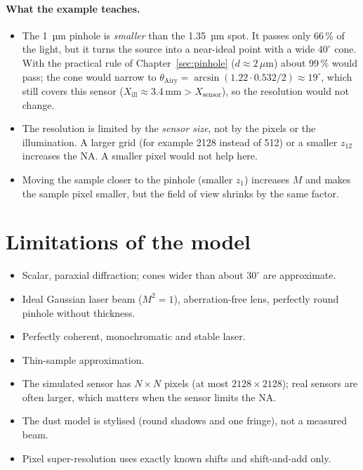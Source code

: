 \documentclass[12pt,a4paper]{article}
\newcommand{\um}{\,\mu\mathrm{m}}
\newcommand{\mm}{\,\mathrm{mm}}
\begin{document}
\paragraph{What the example teaches.}
\begin{itemize}
\item The 1~µm pinhole is \emph{smaller} than the 1.35~µm spot. It passes only 66\,\% of the light, but it turns the source into a near-ideal point with a wide $40^\circ$ cone. With the practical rule of Chapter~\ref{sec:pinhole} ($d\approx2\um$) about 99\,\% would pass; the cone would narrow to $\theta_\mathrm{Airy}=\arcsin(1.22\cdot0.532/2)\approx19^\circ$, which still covers this sensor ($X_\mathrm{ill}\approx3.4\mm>X_\mathrm{sensor}$), so the resolution would not change.
\item The resolution is limited by the \emph{sensor size}, not by the pixels or the illumination. A larger grid (for example 2128 instead of 512) or a smaller $z_{12}$ increases the NA. A smaller pixel would not help here.
\item Moving the sample closer to the pinhole (smaller $z_1$) increases $M$ and makes the sample pixel smaller, but the field of view shrinks by the same factor.
\end{itemize}

\section{Limitations of the model}
\begin{itemize}
\item Scalar, paraxial diffraction; cones wider than about $30^\circ$ are approximate.
\item Ideal Gaussian laser beam ($M^2=1$), aberration-free lens, perfectly round pinhole without thickness.
\item Perfectly coherent, monochromatic and stable laser.
\item Thin-sample approximation.
\item The simulated sensor has $N\times N$ pixels (at most $2128\times2128$); real sensors are often larger, which matters when the sensor limits the NA.
\item The dust model is stylised (round shadows and one fringe), not a measured beam.
\item Pixel super-resolution uses exactly known shifts and shift-and-add only.
\end{itemize}
\end{document}
